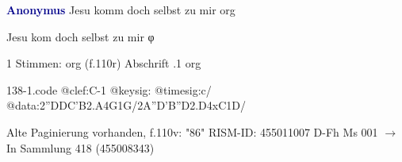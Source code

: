 \documentclass[twocolumn]{book}
\begin{document}
\newline \par \vspace{7pt} \textcolor{darkblue}{\textbf{Anonymus  }}
\newline Jesu komm doch selbst zu mir
\newline org
\newline \begin{itshape} Jesu kom doch selbst zu mir φ\end{itshape} 
\newline \textcolor{darkblue}{}  1 Stimmen: org  (f.110r)
\newline Abschrift
.1  org  
\begin{filecontents*}{138-1.code}
@clef:C-1
@keysig:
@timesig:c/
@data:2''DDC'B2.A4G1G/2A''D'B''D2.D4xC1D/
\end{filecontents*}
\newline
%
\newline Alte Paginierung vorhanden, f.110v: "86"
\newline RISM-ID: 455011007
\newline D-Fh  Ms 001
\newline $\rightarrow$ In Sammlung 418 (455008343)
      
\end{document}
